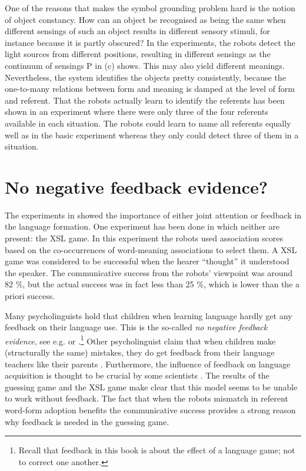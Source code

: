 One of the reasons that makes the symbol grounding problem hard is the notion of object constancy. How can an object be recognised as being the same when different sensings of such an object results in different sensory stimuli, for instance because it is partly obscured? In the experiments, the robots detect the light sources from different positions, resulting in different sensings as the continuum of sensings P in  (c) shows. This may also yield different meanings. Nevertheless, the system identifies the objects pretty consistently, because the one-to-many relations between form and meaning is damped at the level of form and referent. That the robots actually learn to identify the referents has been shown in an experiment where there were only three of the four referents available in each situation. The robots could learn to name all referents equally well as in the basic experiment whereas they only could detect three of them in a situation.



\section{No negative feedback evidence?}\label{s:disc:feed}

The experiments in  showed the importance of either joint attention or feedback in the language formation. One experiment has been done in which neither are present: the XSL game. In this experiment the robots used association scores based on the co-occurrences of word-meaning associations to select them. A XSL game was considered to be successful when the hearer ``thought'' it understood the speaker. The communicative success from the robots' viewpoint was around 82 \%, but the actual success was in fact less than 25 \%, which is lower than the a priori success. 


Many psycholinguists hold that children when learning language hardly get any feedback on their language use. This is the so-called {\em no negative feedback evidence}, see e.g. \citet{braine:1971} or \citet{bowerman:1988}.\footnote{Recall that feedback in this book is about the effect of a language game; not to correct one another.} Other psycholinguist claim that when children make (structurally the same) mistakes, they do get feedback from their language teachers like their parents \citep{demetrasetal:1986}. Furthermore, the influence of feedback on language acquisition is thought to be crucial by some scientists \citep{clancey:1997,demetrasetal:1986,clarkclark:1977,tomasellobarton:1994}. The results of the guessing game and the XSL game make clear that this model seems to be unable to work without feedback. The fact that when the robots mismatch in referent word-form adoption benefits the communicative success provides a strong reason why feedback is needed in the guessing game. 


